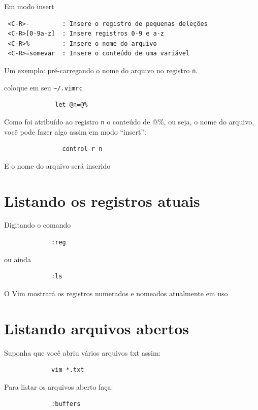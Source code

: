 \documentclass[10pt,a4paper,openany]{book}
\begin{document}
Em modo insert

\begin{verbatim}
 <C-R>-         : Insere o registro de pequenas deleções
 <C-R>[0-9a-z]  : Insere registros 0-9 e a-z
 <C-R>%         : Insere o nome do arquivo
 <C-R>=somevar  : Insere o conteúdo de uma variável
\end{verbatim}


Um exemplo: pré-carregando o nome do arquivo no registro \verb+n+.

coloque em seu \verb+~/.vimrc+

\begin{verbatim}
			  let @n=@%
\end{verbatim}

Como foi atribuído ao registro \verb+n+ o conteúdo de @\%, ou seja, o nome
do arquivo, você pode fazer algo assim em modo ``insert'':

\begin{verbatim}
				control-r n
\end{verbatim}

E o nome do arquivo será inserido

\section{Listando os registros atuais}
\label{Listando os registros atuais}
Digitando o comando

\begin{verbatim}
			 :reg
\end{verbatim}

ou ainda

\begin{verbatim}
			 :ls
\end{verbatim}

O Vim mostrará os registros numerados e nomeados atualmente em uso

\section{Listando arquivos abertos}
\label{Listando arquivos abertos}
Suponha que você abriu vários arquivos txt assim:

\begin{verbatim}
			 vim *.txt
\end{verbatim}

Para listar os arquivos aberto faça:

\begin{verbatim}
			 :buffers
\end{verbatim}
\end{document}
